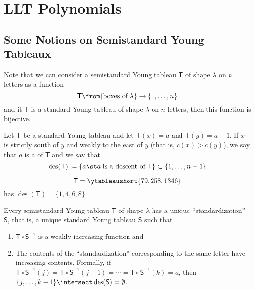 \documentclass[11pt,leqno,oneside]{amsart}
\numberwithin{thm}{section}
\newcommand{\T}{\mathsf{T}} %
\renewcommand{\S}{\mathsf{S}}
\newcommand{\des}{\operatorname{des}}
\begin{document}
\section{LLT Polynomials}
\subsection{Some Notions on Semistandard Young Tableaux}
Note that we can consider a semistandard Young tableau \(\T\) of shape
\(\lambda\) on \(n\) letters as a
function \[
  \T \from \{\text{boxes of }\lambda\} \to \{1,\ldots,n\}
\]
and it \(\T\) is a standard Young tableau of shape \(\lambda\) on
\(n\) letters, then this function is bijective.
\begin{defn}
  Let \(\T\) be a standard Young tableau and let \(\T(x) = a\) and
  \(\T(y) = a+1\). If \(x\) is strictly south of \(y\) and weakly to
  the east of \(y\) (that is, \(c(x) > c(y)\)), we say that
  \(a\) is a  of 
  \(\T\) and we say that \[
    \des(\T) := \{a \st a \text{ is a descent of }\T\} \subset
    \{1,\ldots, n-1\}
  \]
\end{defn}
\begin{example}
  \[
    \T = \ytableaushort{79,258,1346}
  \]
  has \(\des(\T) = \{1,4,6,8\}\)
\end{example}
\begin{prop}
  Every semistandard Young tableau \(\T\) of shape \(\lambda\) has a unique
  ``standardization'' \(\S\), that is, a unique standard Young tableau
  \(\S\) such that
  \begin{enumerate}
  \item \(\T \circ \S^{-1}\) is a weakly increasing function and
  \item The contents of the ``standardization'' corresponding to the
    same letter have increasing contents. Formally, if \(\T \circ
    \S^{-1}(j) = \T \circ \S^{-1}(j+1) = \cdots = \T 
    \circ \S^{-1}(k) = a\), then \(\{j, \ldots, k-1\} \intersect \des(\S)
    = \emptyset\).
  \end{enumerate}
\end{prop}
\end{document}
